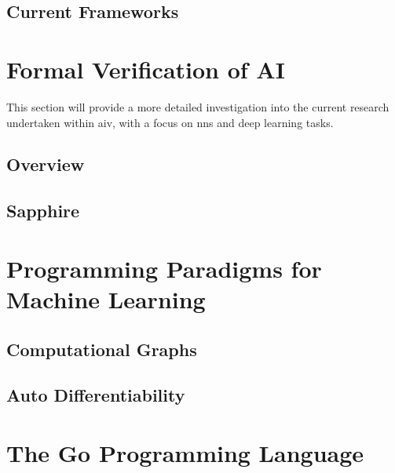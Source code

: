 \subsection{Current Frameworks}


\section{Formal Verification of AI}

This section will provide a more detailed investigation into the current research
undertaken within \gls{aiv}, with a focus on \glspl{nn} and deep learning tasks.

\subsection{Overview}

\subsection{Sapphire}


\section{Programming Paradigms for Machine Learning}\label{section:paradigms}

\subsection{Computational Graphs}
\subsection{Auto Differentiability}

\section{The Go Programming Language}

